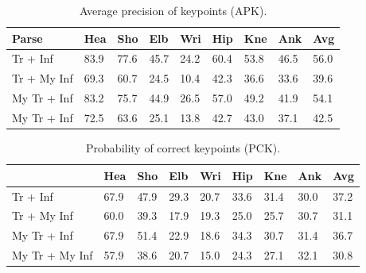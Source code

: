 \documentclass[10pt,twocolumn,letterpaper]{article}
\begin{document}
\begin{table}
  \begin{center}
    \begin{tabular}{|p{2.2cm}|p{0.5cm}|p{0.5cm}|p{0.5cm}|p{0.5cm}|p{0.5cm}|p{0.5cm}|p{0.5cm}||p{0.5cm}|}
      \hline
      Parse                                              & Hea  & Sho  & Elb  & Wri  & Hip  & Kne  & Ank  & Avg \\ \hline
      \hline
      \cite{Yang_PAMI2011} Tr + \cite{Yang_PAMI2011} Inf & 83.9 & 77.6 & 45.7 & 24.2 & 60.4 & 53.8 & 46.5 & 56.0 \\ \hline
      \cite{Yang_PAMI2011} Tr + My Inf                   & 69.3 & 60.7 & 24.5 & 10.4 & 42.3 & 36.6 & 33.6 & 39.6 \\ \hline
      \hline
      My Tr + \cite{Yang_PAMI2011} Inf			 & 83.2 & 75.7 & 44.9 & 26.5 & 57.0 & 49.2 & 41.9 & 54.1 \\ \hline
      My Tr + \cite{Yang_PAMI2011} Inf			 & 72.5 & 63.6 & 25.1 & 13.8 & 42.7 & 43.0 & 37.1 & 42.5 \\ \hline
    \end{tabular}
  \end{center}
  \caption{Average precision of keypoints (APK).}
\end{table}



\begin{table}[t]
  \begin{center}
    \begin{tabular}{|p{2.2cm}|p{0.5cm}|p{0.5cm}|p{0.5cm}|p{0.5cm}|p{0.5cm}|p{0.5cm}|p{0.5cm}||p{0.5cm}|}
      \hline
      		            	                         & Hea  & Sho  & Elb  & Wri  & Hip  & Kne  & Ank  & Avg  \\ \hline
      \hline
      \cite{Yang_PAMI2011} Tr + \cite{Yang_PAMI2011} Inf & 67.9 & 47.9 & 29.3 & 20.7 & 33.6 & 31.4 & 30.0 & 37.2 \\ \hline
      \cite{Yang_PAMI2011} Tr + My Inf                   & 60.0 & 39.3 & 17.9 & 19.3 & 25.0 & 25.7 & 30.7 & 31.1 \\ \hline
      My Tr + \cite{Yang_PAMI2011} Inf			 & 67.9 & 51.4 & 22.9 & 18.6 & 34.3 & 30.7 & 31.4 & 36.7 \\ \hline
      My Tr + My Inf			 		 & 57.9 & 38.6 & 20.7 & 15.0 & 24.3 & 27.1 & 32.1 & 30.8 \\ \hline
    \end{tabular}
  \end{center}
  \caption{Probability of correct keypoints (PCK).}
\end{table} 
\end{document}
